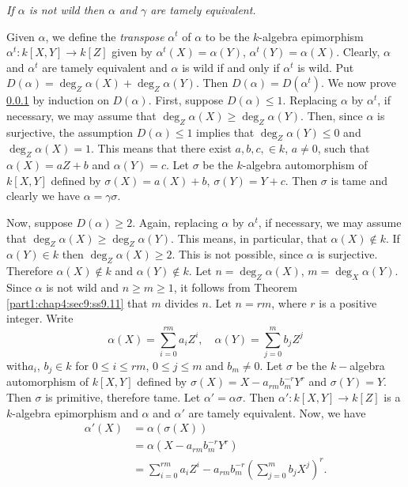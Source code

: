 \setcounter{mysubsection}{19}

\subsubsection{}\label{part1:chap4:sec9:sss9.19.1}

{\em If $\alpha$ is not wild then $\alpha$ and $\gamma$ are tamely equivalent.}

Given $\alpha$, we define the {\em transpose} $\alpha^t$ of $\alpha$ to be the $k$-algebra epimorphism $\alpha^t: k[X, Y] \to k[Z]$ given by $\alpha^t (X)= \alpha(Y)$, $\alpha^t(Y)=\alpha(X)$. Clearly, $\alpha$ and $\alpha^t$ are tamely equivalent and $\alpha$ is wild if and only if $\alpha^t$ is wild. Put $D(\alpha)= \deg_Z \alpha(X)+ \deg_Z \alpha(Y)$. Then $D(\alpha)= D(\alpha^t)$. We now prove \ref{part1:chap4:sec9:sss9.19.1} by induction on $D(\alpha)$. First, suppose $D(\alpha) \leq 1$. Replacing $\alpha$ by $\alpha^t$, if necessary, we may assume that $\deg_Z \alpha(X) \geq \deg_Z \alpha(Y)$. Then, since $\alpha$ is surjective, the assumption $D(\alpha) \leq 1$ implies that $\deg_Z \alpha (Y)\leq 0$ and $\deg_Z\alpha(X)=1$. This means that there exist $a, b, c, \in k$, $a \neq 0$, such that $\alpha(X) = aZ+b$ and $\alpha(Y)=c$. Let $\sigma$ be the $k$-algebra automorphism of $k[X, Y]$ defined by $\sigma(X)=a(X)+b$, $\sigma(Y)= Y+c$. Then $\sigma$ is tame and clearly we have $\alpha = \gamma \sigma$.  

Now, suppose $D(\alpha)\geq 2$. Again, replacing $\alpha$ by $\alpha^t$, if necessary, we may assume that $\deg_Z \alpha(X) \geq \deg_Z\alpha (Y)$. This means, in particular, that $\alpha (X) \notin k$. If $\alpha(Y) \in k$ then $\deg_Z \alpha(X) \geq 2$. This is not possible, since $\alpha$ is  surjective. Therefore $\alpha(X) \notin k$ and $\alpha(Y) \notin k$. Let $n= \deg_Z \alpha(X)$, $m = \deg_X \alpha(Y)$. Since $\alpha$ is not wild and $n \geq m \geq 1$, it follows from Theorem \ref{part1:chap4:sec9:ss9.11} that $m$ divides $n$. Let $n=rm$, where $r$ is a positive integer. Write
$$
\alpha(X) = \sum_{i=0}^{rm} a_i Z^i, \quad \alpha(Y) = \sum^m_{j=0} b_j Z^j
$$
with\pageoriginale $a_i$, $b_j \in k$ for $0 \leq i \leq rm$, $0 \leq j \leq m$ and $b_m \neq 0$. Let $\sigma$ be the $k-$algebra
 automorphism of $k[X, Y]$ defined by $\sigma (X)= X-a_{rm} b_m^{-r}Y^r$ and $\sigma(Y)= Y$. Then $\sigma$ is primitive, therefore tame. Let $\alpha' = \alpha\sigma$. Then $\alpha' : k [X, Y] \to k [Z]$ is a $k$-algebra epimorphism and $\alpha$ and $\alpha'$ are tamely equivalent. Now, we have
\begin{align*}
  \alpha' (X) & = \alpha (\sigma (X))\\
  & = \alpha(X-a_{rm} b_{m}^{-r} Y^r)\\
  & = \sum_{i=0}^{rm} a_i Z^i - a_{rm}b_m^{-r} \left(\sum^m_{j=0} b_jX^j\right)^r.
\end{align*}

